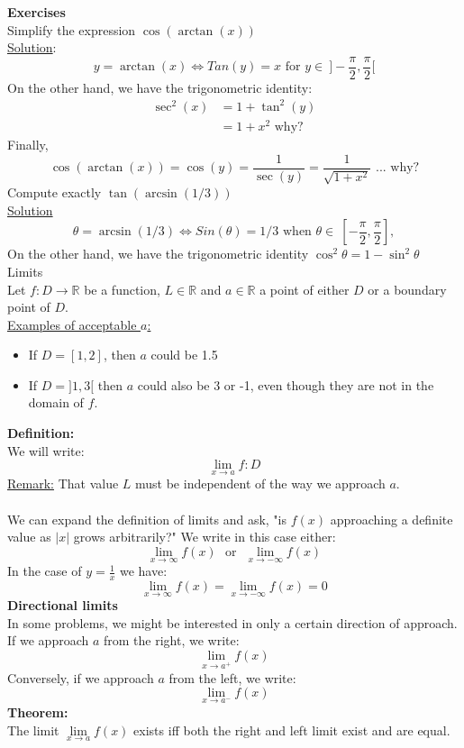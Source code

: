 \documentclass[]{article}
\begin{document}
	{\bf Exercises}\\
	Simplify the expression $\cos(\arctan(x))$\\
	\underline{Solution}:
	$$y=\arctan(x)\iff Tan(y)=x \text{ for } y\in~]-\frac{\pi}{2},\frac{\pi}{2}[$$
	On the other hand, we have the trigonometric identity:
	\begin{align*}
		\sec^2(x)&=1+\tan^2(y)\\
		&=1+x^2\text{ why?}
	\end{align*}
	Finally,
	$$
	\cos(\arctan(x))=\cos(y)=\frac{1}{\sec(y)}=\frac{1}{\sqrt{1+x^2}}\text{ ... why?}
	$$
	Compute exactly $\tan(\arcsin(1/3))$\\
	\underline{Solution}\\
	$$
		\theta=\arcsin(1/3)\iff Sin(\theta)=1/3\text{ when }\theta\in~[-\frac{\pi}{2},\frac{\pi}{2}],
	$$
	On the other hand, we  have the trigonometric identity $\cos^2\theta=1-\sin^2\theta$
	\pagebreak\\
	\Large{Limits}\\
	\normalsize
	Let $f:D\rightarrow\mathbb{R}$ be a function, $L\in\mathbb{R}$ and $a\in\mathbb{R}$ a point of either $D$ or a boundary point of $D$.\\
	\underline{Examples of acceptable $a$:}
	\begin{itemize}
		\item If $D=[1,2]$, then $a$ could be 1.5
		\item If $D=]1,3[$ then $a$ could also be 3 or -1, even though they are not in the domain of $f$.
	\end{itemize}
	{\bf Definition:}\\
	We will write:
	$$
		\lim_{x\to a}f:D
	$$
	\underline{Remark:} That value $L$ must be independent of the way we approach $a$.\\\\
	We can expand the definition of limits and ask, "is $f(x)$ approaching a definite value as $|x|$ grows arbitrarily?" We write in this case either:
	$$
		\lim_{x\to \infty}f(x)~~~\text{or}~~~\lim_{x\to-\infty}f(x)
	$$
	In the case of $y=\frac{1}{x}$ we have:
	$$
		\lim_{x\to\infty}f(x)=\lim_{x\to -\infty}f(x)=0
	$$
	{\bf Directional limits}\\
	In some problems, we might be interested in only a certain direction of approach.\\
	If we approach $a$ from the right, we write:
	$$
		\lim_{x\to a^+}f(x)
	$$
	Conversely, if we approach $a$ from the left, we write:
	$$
		\lim_{x\to a^-}f(x)
	$$
	{\bf Theorem:}\\
	The limit $\lim\limits_{x\to a}f(x)$ exists iff both the right and left limit exist and are equal.\\
	
\end{document}
